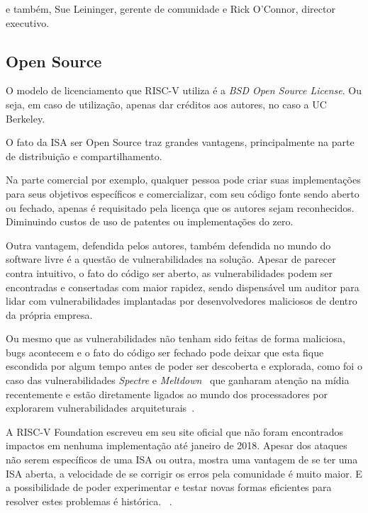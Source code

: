 		e também, Sue Leininger, gerente de comunidade e Rick O’Connor, director executivo.~\cite{riscv_fboardmembers}

	\subsection{Open Source}
		
		O modelo de licenciamento que RISC-V utiliza é a \textit{BSD Open Source License}. Ou seja, em caso de utilização, apenas dar créditos aos autores, no caso a UC Berkeley.~\cite{riscv_faq}

		O fato da ISA ser Open Source traz grandes vantagens, principalmente na parte de distribuição e compartilhamento.
		
		Na parte comercial por exemplo, qualquer pessoa pode criar suas implementações para seus objetivos específicos e comercializar, com seu código fonte sendo aberto ou fechado, apenas é requisitado pela licença que os autores sejam reconhecidos. Diminuindo custos de uso de patentes ou implementações do zero.

		Outra vantagem, defendida pelos autores, também defendida no mundo do software livre é a questão de vulnerabilidades na solução. Apesar de parecer contra intuitivo, o fato do código ser aberto, as vulnerabilidades podem ser encontradas e consertadas com maior rapidez, sendo dispensável um auditor para lidar com vulnerabilidades implantadas por desenvolvedores maliciosos de dentro da própria empresa.

		Ou mesmo que as vulnerabilidades não tenham sido feitas de forma maliciosa, bugs acontecem e o fato do código ser fechado pode deixar que esta fique escondida por algum tempo antes de poder ser descoberta e explorada, como foi o caso das vulnerabilidades \textit{Spectre} e \textit{Meltdown}~\cite{meltdown_spectre_exploits} que ganharam atenção na mídia recentemente e estão diretamente ligados ao mundo dos processadores por explorarem vulnerabilidades arquiteturais~\cite{meltdown_spectre_media}.

		A RISC-V Foundation escreveu em seu site oficial que não foram encontrados impactos em nenhuma implementação até janeiro de 2018. Apesar dos ataques não serem específicos de uma ISA ou outra, mostra uma vantagem de se ter uma ISA aberta, a velocidade de se corrigir os erros pela comunidade é muito maior. E a possibilidade de poder experimentar e testar novas formas eficientes para resolver estes problemas é histórica. ~\cite{riscv_security}.

